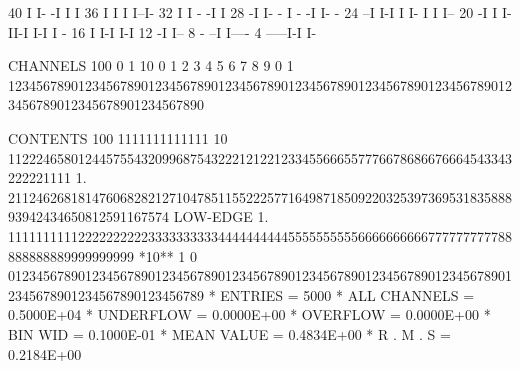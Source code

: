 \begin{Listing}
       40                          I                      I-           -I                        I  I
       36                          I                       I           I                         I--I-
       32                          I                       I    -     -I                             I
       28                         -I                       I- - I -  -I                              I- -
       24                       --I                         I-I I I- I                                I I--
       20                      -I                             I I-II-I                                I-I I -
       16                      I                              I-I                                         I-I
       12                     -I                                                                            I--
        8                 - --I                                                                               I----
        4            -----I-I                                                                                     I-
 
 CHANNELS 100   0                                                                                                  1   
           10   0        1         2         3         4         5         6         7         8         9         0   
            1   1234567890123456789012345678901234567890123456789012345678901234567890123456789012345678901234567890   
 
 CONTENTS 100                          1111111111111                                                                
           10                 112224658012445755432099687543222121221233455666557776678686676664543343222221111     
            1.       21124626818147606828212710478511552225771649871850922032539736953183588893942434650812591167574
 LOW-EDGE   1.            111111111122222222223333333333444444444455555555556666666666777777777788888888889999999999
 *10**  1   0   0123456789012345678901234567890123456789012345678901234567890123456789012345678901234567890123456789
 * ENTRIES =       5000      * ALL CHANNELS = 0.5000E+04      * UNDERFLOW = 0.0000E+00      * OVERFLOW = 0.0000E+00
 * BIN WID = 0.1000E-01      * MEAN VALUE   = 0.4834E+00      * R . M . S = 0.2184E+00


\end{Listing}
